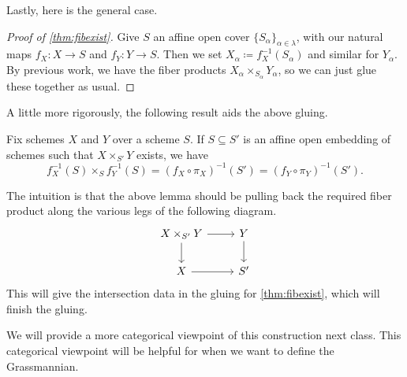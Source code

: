 \documentclass[../notes.tex]{subfiles}
\begin{document}
Lastly, here is the general case.
\begin{proof}[Proof of \autoref{thm:fibexist}]
	Give $S$ an affine open cover $\{S_\alpha\}_{\alpha\in\lambda}$, with our natural maps $f_X\colon X\to S$ and $f_Y\colon Y\to S$. Then we set $X_\alpha\coloneqq f_X^{-1}(S_\alpha)$ and similar for $Y_\alpha$. By previous work, we have the fiber products $X_\alpha\times_{S_\alpha}Y_\alpha$, so we can just glue these together as usual.
\end{proof}
A little more rigorously, the following result aids the above gluing.
\begin{lemma}
	Fix schemes $X$ and $Y$ over a scheme $S$. If $S\subseteq S'$ is an affine open embedding of schemes such that $X\times_{S'}Y$ exists, we have
	\[f_X^{-1}(S)\times_Sf_Y^{-1}(S)=(f_X\circ\pi_X)^{-1}(S')=(f_Y\circ\pi_Y)^{-1}(S').\]
\end{lemma}
The intuition is that the above lemma should be pulling back the required fiber product along the various legs of the following diagram.
\[\begin{tikzcd}
	{X\times_{S'}Y} & Y \\
	X & {S'}
	\arrow[from=1-1, to=1-2]
	\arrow[from=1-2, to=2-2]
	\arrow[from=1-1, to=2-1]
	\arrow[from=2-1, to=2-2]
\end{tikzcd}\]
This will give the intersection data in the gluing for \autoref{thm:fibexist}, which will finish the gluing.
\begin{remark}
	We will provide a more categorical viewpoint of this construction next class. This categorical viewpoint will be helpful for when we want to define the Grassmannian.
\end{remark}
\end{document}

